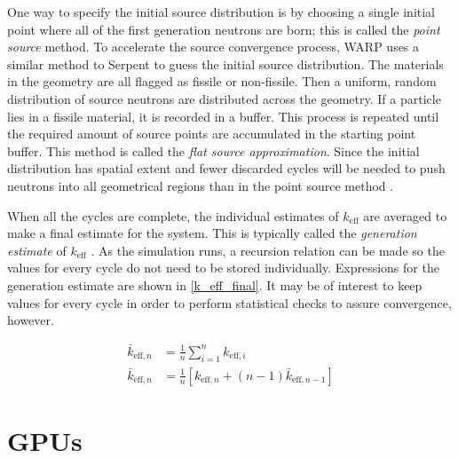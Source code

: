 One way to specify the initial source distribution is by choosing a single initial point where all of the first generation neutrons are born; this is called the \emph{point source} method. To accelerate the source convergence process, WARP uses a similar method to Serpent to guess the initial source distribution.  The materials in the geometry are all flagged as fissile or non-fissile.  Then a uniform, random distribution of source neutrons are distributed across the geometry.  If a particle lies in a fissile material, it is recorded in a buffer.  This process is repeated until the required amount of source points are accumulated in the starting point buffer.  This method is called the \emph{flat source approximation}. Since the initial distribution has spatial extent and fewer discarded cycles will be needed to push neutrons into all geometrical regions than in the point source method \cite{jaakko}.

When all the cycles are complete, the individual estimates of $k_\mathrm{eff}$ are averaged to make a final estimate for the system.  This is typically called the \emph{generation estimate} of $k_\mathrm{eff}$ \cite{jaakko}.  As the simulation runs, a recursion relation can be made so the values for every cycle do not need to be stored individually.  Expressions for the generation estimate are shown in \eqref{k_eff_final}.  It may be of interest to keep values for every cycle in order to perform statistical checks to assure convergence, however.

\begin{equation}
\label{k_eff_final}
\begin{split}
\bar{k}_{\mathrm{eff},n} &= \frac{1}{n} \sum_{i=1}^{n} k_{\mathrm{eff},i} \\
\bar{k}_{\mathrm{eff},n} &= \frac{1}{n} \left[ k_{\mathrm{eff},n} + (n-1) \bar{k}_{\mathrm{eff},n-1}  \right]
\end{split}
\end{equation}



\section{GPUs}

